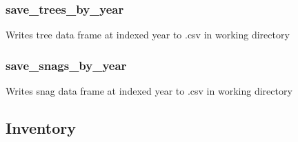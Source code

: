 \documentclass[letterpaper,10pt,english]{sphinxmanual}
\begin{document}
\subsubsection{save\_trees\_by\_year}
\label{Fvsfuels:save-trees-by-year}

\begin{fulllineitems}
\label{Fvsfuels:fuels.Fvsfuels.save_trees_by_year}
Writes tree data frame at indexed year to .csv in working directory

\end{fulllineitems}



\subsubsection{save\_snags\_by\_year}
\label{Fvsfuels:save-snags-by-year}

\begin{fulllineitems}
\label{Fvsfuels:fuels.Fvsfuels.save_snags_by_year}
Writes snag data frame at indexed year to .csv in working directory

\end{fulllineitems}



\subsection{Inventory}
\label{Inventory::doc}\label{Inventory:inventory}
\end{document}
